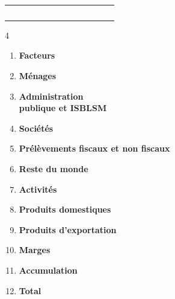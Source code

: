 \begin{table}[!h]
{{\begin{tabular}{|c|c|c|c|c|c|c|c|c|c|c|c|c|}
$$			\end{tabular}%
	}}
	\begin{multicols}{4}
		\begin{enumerate}[font=\bfseries\sffamily]\sffamily\small
			\item \textbf{Facteurs}
			\item \textbf{Ménages}
			\item \textbf{Administration\\ publique et ISBLSM}
			\item \textbf{Sociétés}
			\item \textbf{Prélèvements fiscaux et non fiscaux}
			\item \textbf{Reste du monde}
			\item \textbf{Activités}
			\item \textbf{Produits domestiques}
			\item \textbf{Produits d'exportation}
			\item \textbf{Marges}
			\item \textbf{Accumulation}
			\item \textbf{Total}
		\end{enumerate}
	\end{multicols}
	\label{tab:MACROSAMFORMULA}%
\end{table}%

\newpage

